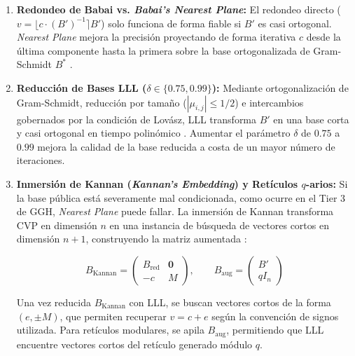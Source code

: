 \documentclass[12pt,a4paper]{article}
\begin{document}
\begin{enumerate}

    \item \textbf{Redondeo de Babai vs. \textit{Babai's Nearest Plane}:}
    El redondeo directo
    ($v = \lfloor c \cdot (B')^{-1} \rceil B'$)
    solo funciona de forma fiable si $B'$ es casi ortogonal.
    \textit{Nearest Plane} mejora la precisión proyectando
    de forma iterativa $c$ desde la última componente hasta
    la primera sobre la base ortogonalizada de Gram-Schmidt
    $B^*$ \cite{babai1986}.

    \item \textbf{Reducción de Bases LLL
    ($\delta \in \{0.75, 0.99\}$):}
    Mediante ortogonalización de Gram-Schmidt,
    reducción por tamaño ($|\mu_{i,j}| \le 1/2$)
    e intercambios gobernados por la condición de Lovász,
    LLL transforma $B'$ en una base corta y casi
    ortogonal en tiempo polinómico \cite{lenstra1982}.
    Aumentar el parámetro $\delta$ de $0.75$ a $0.99$
    mejora la calidad de la base reducida a costa
    de un mayor número de iteraciones.

    \item \textbf{Inmersión de Kannan
    (\textit{Kannan's Embedding}) y Retículos $q$-arios:}
    Si la base pública está severamente mal condicionada,
    como ocurre en el Tier 3 de GGH,
    \textit{Nearest Plane} puede fallar.
    La inmersión de Kannan transforma CVP en dimensión
    $n$ en una instancia de búsqueda de vectores cortos
    en dimensión $n+1$, construyendo la matriz aumentada \cite{kannan1987}:

    \begin{equation}
        B_{\text{Kannan}} =
        \begin{pmatrix}
            B_{\text{red}} & \mathbf{0} \\
            -c & M
        \end{pmatrix},
        \qquad
        B_{\text{aug}} =
        \begin{pmatrix}
            B' \\
            q I_n
        \end{pmatrix}
    \end{equation}

    Una vez reducida $B_{\text{Kannan}}$ con LLL,
    se buscan vectores cortos de la forma
    $(e, \pm M)$, que permiten recuperar
    $v = c + e$ según la convención de signos utilizada.
    Para retículos modulares, se apila
    $B_{\text{aug}}$, permitiendo que LLL
    encuentre vectores cortos del retículo
    generado módulo $q$.


\end{enumerate}
\end{document}
